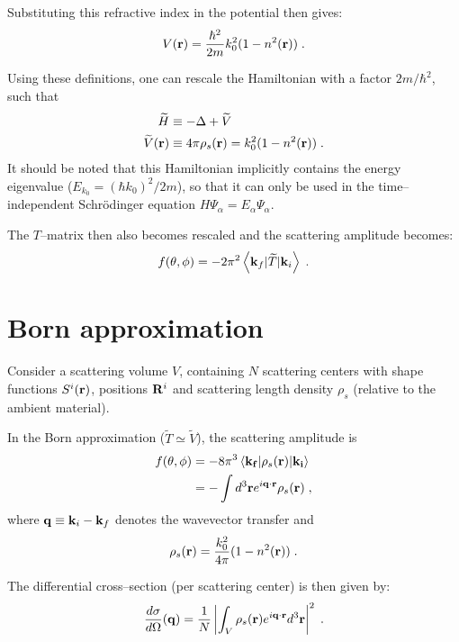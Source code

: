 Substituting this refractive index in the potential then gives:
\begin{equation*}
  V(\mathbf{r}) = \frac{\hbar^2}{2m}k_0^2(1-n^2(\mathbf{r})) \; .
\end{equation*}

Using these definitions, one can rescale the Hamiltonian with a factor $2m/\hbar^2$, such that
\begin{align*}
  \widetilde{H} &\equiv -\Delta + \widetilde{V} \nonumber \\
  \widetilde{V}(\mathbf{r}) &\equiv 4\pi\rho_s(\mathbf{r}) = k_0^2(1-n^2(\mathbf{r})) \; .
\end{align*}
It should be noted that this Hamiltonian implicitly contains the energy eigenvalue ($E_{k_0}=(\hbar k_0)^2/2m$), so that it can only be used in the time--independent Schr\"odinger equation $H\Psi_\alpha = E_\alpha \Psi_\alpha$.

The $T$--matrix then also becomes rescaled and the scattering amplitude becomes:
\begin{equation*}
  f(\theta, \phi) = -2\pi^2 \left\langle \mathbf{k}_f \vert \widetilde{T} \vert \mathbf{k}_i \right\rangle \; .
\end{equation*}

\section{Born approximation} \label{sec:ba}
Consider a scattering volume $V$, containing $N$ scattering centers with shape functions $S^i(\mathbf{r})$, positions $\mathbf{R}^i$ and scattering length density $\rho_s$ (relative to the ambient material).

In the Born approximation ($\widetilde{T}\simeq\widetilde{V}$), the scattering amplitude is
\begin{align*}
  f(\theta, \phi) & = -8\pi^3 \left\langle \mathbf{k_f} \vert \rho_s(\mathbf{r}) \vert \mathbf{k_i} \right\rangle \nonumber \\
  & = -\int d^3\mathbf{r} e^{i\mathbf{q}\cdot\mathbf{r}} \rho_s(\mathbf{r}) \; ,
\end{align*}
where $\mathbf{q}\equiv \mathbf{k}_i - \mathbf{k}_f$ denotes the wavevector transfer and
\begin{equation*}
  \rho_s(\mathbf{r}) = \frac{k_0^2}{4\pi}(1-n^2(\mathbf{r})) \; .
\end{equation*}

The differential cross--section (per scattering center) is then given by:
\begin{equation*}
  \frac{d\sigma}{d\Omega}(\mathbf{q}) = \frac{1}{N}\left\lvert \int_V \rho_s(\mathbf{r}) e^{i\mathbf{q}\cdot\mathbf{r}} d^3\mathbf{r} \right\rvert ^2 \; .
\end{equation*}

